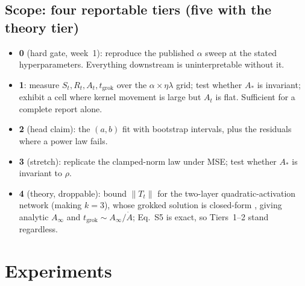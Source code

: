 \documentclass[a4paper,11pt]{article} %
\newcommand{\tgrok}{t_{\mathrm{grok}}}
\newcommand{\Astar}{A_{*}}
\begin{document}
\subsection{Scope: four reportable tiers (five with the theory tier)}
\begin{itemize}
	\item \textbf{0} (hard gate, week~1): reproduce the published $\alpha$ sweep
		at the stated hyperparameters. Everything downstream is uninterpretable
		without it.
	\item \textbf{1}: measure $S_t,R_t,A_t,\tgrok$ over the $\alpha\times\eta\lambda$
		grid; test whether $\Astar$ is invariant; exhibit a cell where kernel
		movement is large but $A_t$ is flat. Sufficient for a complete report alone.
	\item \textbf{2} (head claim): the $(a,b)$ fit with bootstrap intervals, plus
		the residuals where a power law fails.
	\item \textbf{3} (stretch): replicate the clamped-norm law under MSE; test
		whether $\Astar$ is invariant to $\rho$.
	\item \textbf{4} (theory, droppable): bound $\lVert T_t\rVert$ for the
		two-layer quadratic-activation network (making $k=3$), whose grokked
		solution is closed-form \citep{gromov2023grokking}, giving analytic
		$A_\infty$ and $\tgrok\sim A_\infty/\dot A$; Eq.~S5 is exact, so Tiers~1--2
		stand regardless.
\end{itemize}

\section{Experiments}
\label{sec:experiments}

\end{document}
